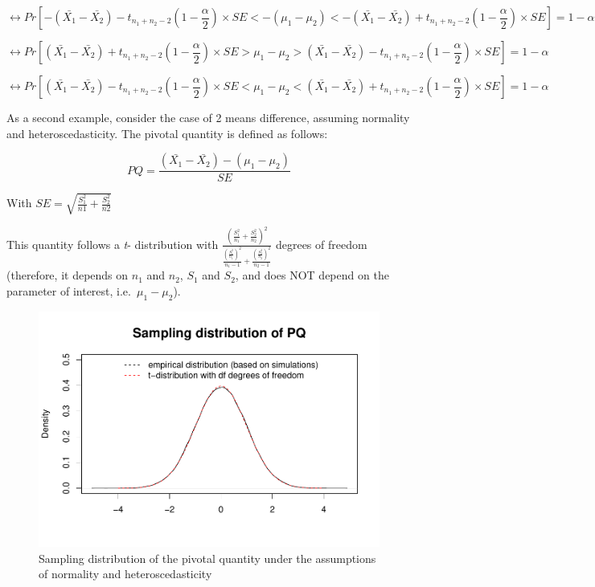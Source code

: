 \documentclass[
  man,floatsintext]{apa6}
\begin{document}
\begin{equation} 
\leftrightarrow Pr[-(\bar{X_1}-\bar{X_2}) -t_{n_1+n_2-2}(1-\frac{\alpha}{2}) \times SE <
-(\mu_1-\mu_2) 
< -(\bar{X_1}-\bar{X_2}) +t_{n_1+n_2-2}(1-\frac{\alpha}{2}) \times SE]= 1- \alpha
\label{eq:conflev4}
\end{equation}

\begin{equation} 
\leftrightarrow Pr[(\bar{X_1}-\bar{X_2}) +t_{n_1+n_2-2}(1-\frac{\alpha}{2}) \times SE > \mu_1-\mu_2 > (\bar{X_1}-\bar{X_2}) - t_{n_1+n_2-2}(1-\frac{\alpha}{2}) \times SE]= 1- \alpha
\label{eq:conflev5}
\end{equation}

\begin{equation} 
\leftrightarrow Pr[(\bar{X_1}-\bar{X_2}) - t_{n_1+n_2-2}(1-\frac{\alpha}{2}) \times SE < \mu_1-\mu_2 <(\bar{X_1}-\bar{X_2}) +t_{n_1+n_2-2}(1-\frac{\alpha}{2}) \times SE]= 1- \alpha
\label{eq:conflev6}
\end{equation}

As a second example, consider the case of 2 means difference, assuming normality and heteroscedasticity. The pivotal quantity is defined as follows:

\begin{equation} 
PQ= \frac{(\bar{X_1}-\bar{X_2})-(\mu_1-\mu_2)}{SE}
\label{eq:PQwelch}
\end{equation}

With \(SE = \sqrt{\frac{S^2_1}{n1}+\frac{S^2_2}{n2}}\)

This quantity follows a \emph{t}- distribution with \(\frac{(\frac{S^2_1}{n_1}+\frac{S^2_2}{n_2})^2}{\frac{(\frac{S^2_1}{n_1})^2}{n_1-1}+\frac{(\frac{S^2_2}{n_2})^2}{n_2-1}}\) degrees of freedom (therefore, it depends on \(n_1\) and \(n_2\), \(S_1\) and \(S_2\), and does NOT depend on the parameter of interest, i.e.~\(\mu_1-\mu_2\)).

\begin{figure}
\centering
\includegraphics{Appendix2_files/figure-latex/SAMPLMEANDIFF2-1.pdf}
\caption{\label{fig:SAMPLMEANDIFF2}Sampling distribution of the pivotal quantity under the assumptions of normality and heteroscedasticity}
\end{figure}
\end{document}
